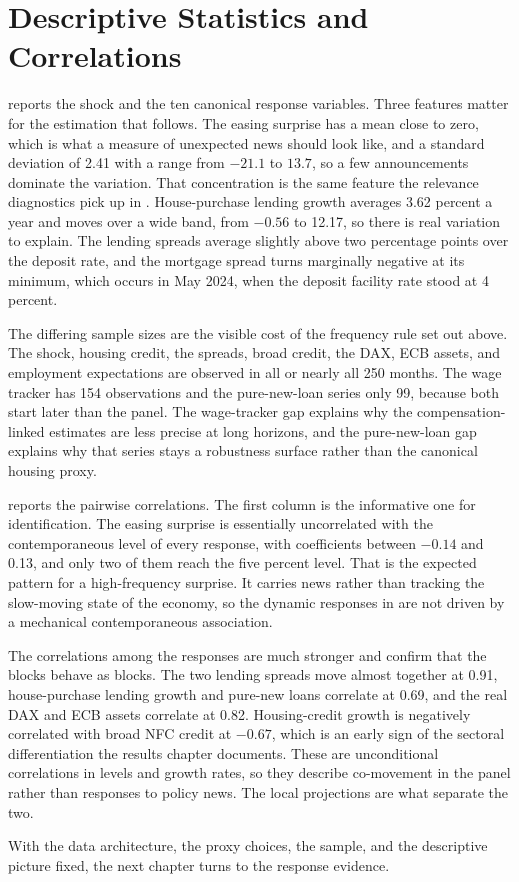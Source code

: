 \section{Descriptive Statistics and Correlations}

 reports the shock and the ten canonical response variables. Three features matter for the estimation that follows. The easing surprise has a mean close to zero, which is what a measure of unexpected news should look like, and a standard deviation of 2.41 with a range from \(-21.1\) to \(13.7\), so a few announcements dominate the variation. That concentration is the same feature the relevance diagnostics pick up in . House-purchase lending growth averages 3.62 percent a year and moves over a wide band, from \(-0.56\) to 12.17, so there is real variation to explain. The lending spreads average slightly above two percentage points over the deposit rate, and the mortgage spread turns marginally negative at its minimum, which occurs in May 2024, when the deposit facility rate stood at 4 percent.

The differing sample sizes are the visible cost of the frequency rule set out above. The shock, housing credit, the spreads, broad credit, the DAX, ECB assets, and employment expectations are observed in all or nearly all 250 months. The wage tracker has 154 observations and the pure-new-loan series only 99, because both start later than the panel. The wage-tracker gap explains why the compensation-linked estimates are less precise at long horizons, and the pure-new-loan gap explains why that series stays a robustness surface rather than the canonical housing proxy.



 reports the pairwise correlations. The first column is the informative one for identification. The easing surprise is essentially uncorrelated with the contemporaneous level of every response, with coefficients between \(-0.14\) and 0.13, and only two of them reach the five percent level. That is the expected pattern for a high-frequency surprise. It carries news rather than tracking the slow-moving state of the economy, so the dynamic responses in  are not driven by a mechanical contemporaneous association.

The correlations among the responses are much stronger and confirm that the blocks behave as blocks. The two lending spreads move almost together at 0.91, house-purchase lending growth and pure-new loans correlate at 0.69, and the real DAX and ECB assets correlate at 0.82. Housing-credit growth is negatively correlated with broad NFC credit at \(-0.67\), which is an early sign of the sectoral differentiation the results chapter documents. These are unconditional correlations in levels and growth rates, so they describe co-movement in the panel rather than responses to policy news. The local projections are what separate the two.



With the data architecture, the proxy choices, the sample, and the descriptive picture fixed, the next chapter turns to the response evidence.
